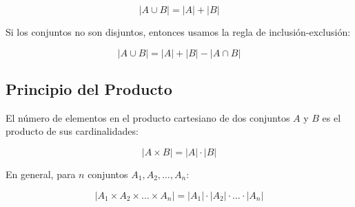 \documentclass{article}
\begin{document}
\[
|A \cup B| = |A| + |B|
\]

Si los conjuntos no son disjuntos, entonces usamos la regla de inclusión-exclusión:

\[
|A \cup B| = |A| + |B| - |A \cap B|
\]

\subsection{Principio del Producto}

El número de elementos en el producto cartesiano de dos conjuntos \( A \) y \( B \) es el producto de sus cardinalidades:

\[
|A \times B| = |A| \cdot |B|
\]

En general, para \( n \) conjuntos \( A_1, A_2, \dots, A_n \):

\[
|A_1 \times A_2 \times \dots \times A_n| = |A_1| \cdot |A_2| \cdot \dots \cdot |A_n|
\]
\end{document}
